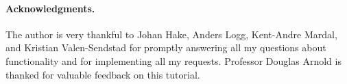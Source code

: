 \paragraph{Acknowledgments.}
The author is very thankful to Johan Hake, Anders Logg, 
Kent-Andre Mardal, and Kristian Valen-Sendstad 
for promptly answering all my questions about
\fenics{} functionality and for implementing all my requests.
Professor Douglas Arnold is thanked for valuable feedback on
this tutorial.
